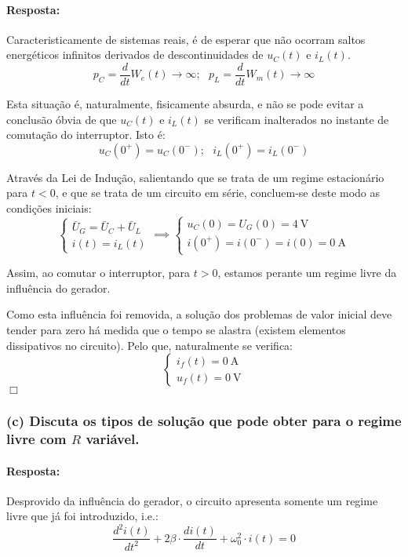 \paragraph{Resposta:}
Caracteristicamente de sistemas reais, é de esperar que não ocorram saltos energéticos infinitos derivados de descontinuidades de $u_C(t)$ e $i_L(t)$.
$$
    p_C = \frac{d}{dt}W_e(t) \to \infty;\ \ \ p_L = \frac{d}{dt}W_m(t) \to \infty
$$

Esta situação é, naturalmente, fisicamente absurda, e não se pode evitar a conclusão óbvia de que $u_C(t)$ e $i_L(t)$ se verificam inalterados no instante de comutação do interruptor. Isto é:
$$
    u_C(0^+) = u_C(0^-);\ \ \ i_L(0^+) = i_L(0^-) 
$$

Através da Lei de Indução, salientando que se trata de um regime estacionário para $t < 0$, e que se trata de um circuito em série, concluem-se deste modo as condições iniciais:
$$
    \begin{cases}
        \bar{U}_G = \bar{U}_C + \bar{U}_L \\
        i(t) = i_L(t)
    \end{cases}
    \implies
    \begin{cases}
        u_C(0) = U_G(0) = 4\ \text{V} \\
        i(0^+) = i(0^-) = i(0) = 0\ \text{A}
    \end{cases}
$$

Assim, ao comutar o interruptor, para $t > 0$, estamos perante um regime livre da influência do gerador. 

Como esta influência foi removida, a solução dos problemas de valor inicial deve tender para zero há medida que o tempo se alastra (existem elementos dissipativos no circuito). Pelo que, naturalmente se verifica:
$$
    \begin{cases}
        i_f(t) = 0\ \text{A}\\
        u_f(t) = 0\ \text{V}
    \end{cases}
$$
\hfill \ensuremath{\Box}
\subsubsection*{(c) Discuta os tipos de solução que pode obter para o regime livre com ${R}$ variável.}
\label{subsubsec_c2}
\paragraph{Resposta:} 
Desprovido da influência do gerador, o circuito apresenta somente um regime livre que já foi introduzido, i.e.:
$$
    \dfrac{d^2i(t)}{dt^2} + 2\beta \cdot \dfrac{di(t)}{dt} + \omega_{0}^{2}\cdot i(t) = 0
$$

